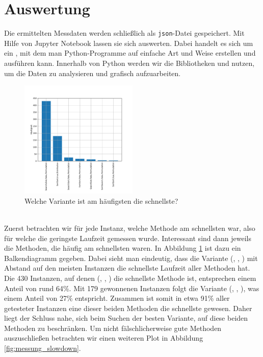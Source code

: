 \section{Auswertung}
Die ermittelten Messdaten werden schließlich als \texttt{json}-Datei gespeichert. Mit Hilfe von 
Jupyter Notebook lassen sie sich auswerten. Dabei
handelt es sich um ein , mit dem man Python-Programme auf einfache Art und Weise erstellen und 
ausführen kann.
Innerhalb von Python werden wir die Bibliotheken  und  nutzen, um die Daten
zu analysieren und grafisch aufzuarbeiten.
\begin{figure}
\centering
	\includegraphics[width = 0.5\textwidth]{figures/counting.pdf}
	\caption{Welche Variante ist am häufigsten die schnellste?}
	\label{fig:messung_counting}
\end{figure}
\\
Zuerst betrachten wir für jede Instanz, welche Methode am schnellsten war, also für welche die geringste
Laufzeit gemessen wurde. Interessant sind dann jeweils die Methoden, die häufig am schnellsten waren.
In Abbildung \ref{fig:messung_counting} ist dazu ein Balkendiagramm gegeben.
Dabei sieht man eindeutig, dass die Variante (\SeaUSet, \false, \perm) mit Abstand 
auf den meisten Instanzen die schnellste Laufzeit aller Methoden hat. Die
430 Instanzen, auf denen (\SeaUSet, \false, \perm) die schnellste Methode ist, entsprechen einem Anteil von rund
64\%. Mit 179 \glqq gewonnenen\grqq{} Instanzen folgt die Variante (\SorSor, \true, \distr), was einem Anteil von
27\% entspricht. Zusammen ist somit in etwa 91\% aller getesteter Instanzen eine dieser beiden Methoden
die schnellste gewesen. Daher liegt der Schluss nahe, sich beim Suchen der \glqq besten\grqq{} Variante,
auf diese beiden Methoden zu beschränken. Um nicht fälschlicherweise \glqq gute\grqq{} Methoden auszuschließen
betrachten wir einen weiteren Plot in Abbildung \ref{fig:messung_slowdown}. 
